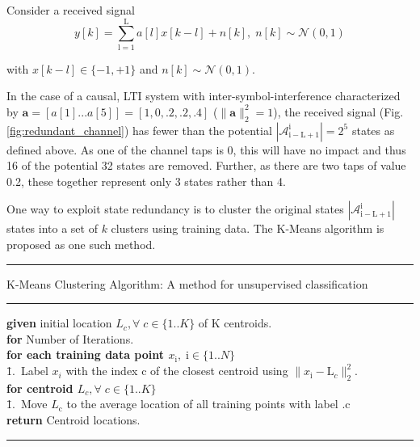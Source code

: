 \documentclass[12pt,a4paper]{report}
\begin{document}
Consider a received signal
\begin{equation*}
y[k] = \sum_{\mathrm{l=1}}^{\mathrm{L}} a[l]x[k-l] + n[k], \; n[k]  \sim \mathcal{N}(0,1)
\end{equation*}

with $x[k-l] \in \{ -1, +1\}$ and $n[k]  \sim \mathcal{N}(0,1)$.  

In the case of a causal, LTI system with inter-symbol-interference characterized by $\mathbf{a} = [a[1]...a[5]]=[1, 0, .2, .2, .4]$ ($\|\mathbf{a}\|^2_2 = 1$), the received signal (Fig.\ref{fig:redundant_channel}) has fewer than the potential $|\mathcal{A}_{\mathrm{i-L+1}}^{\mathrm{i}}| =2^5$ states as defined above. As one of the channel taps is 0, this will have no impact and thus 16 of the potential 32 states are removed. Further, as there are two taps of value 0.2, these together represent only 3 states rather than 4. 


One way to exploit state redundancy is to cluster the original states $|\mathcal{A}_{\mathrm{i-L+1}}^{\mathrm{i}}|$  states into a set of $k$ clusters using training data. The K-Means algorithm is proposed as one such method.
\\

    \noindent\rule[16pt]{\textwidth}{0.6pt}
K-Means Clustering Algorithm: A method for unsupervised classification

    \noindent\rule[10pt]{\textwidth}{0.4pt}
    {\footnotesize
    \begin{tabbing}
    {\bf given} initial location $L_c, \forall \;c  \in \{1..K\}$ of K centroids.\\
        {\textbf{for} Number of Iterations}.\\
         \qquad \= {\bf for each training data point $x_{\mathrm{i}}, \;\mathrm{i}  \in \{1..N\}$}\\
        \qquad \qquad \= 1.\ Label $x_i$ with the index c of the closest centroid using $\|x_{\mathrm{i}}- \text{L}_c\|^2_2$. \\
        \qquad \= {\bf for centroid $L_c, \forall \;c  \in \{1..K\}$}\\
                \qquad \qquad \= 1.\ Move $L_{\mathrm{c}}$ to the average location of all training points with label .c\\


        {\bf return} Centroid locations.
    \end{tabbing}}
    \noindent\rule[10pt]{\textwidth}{0.4pt}
    
\end{document}

